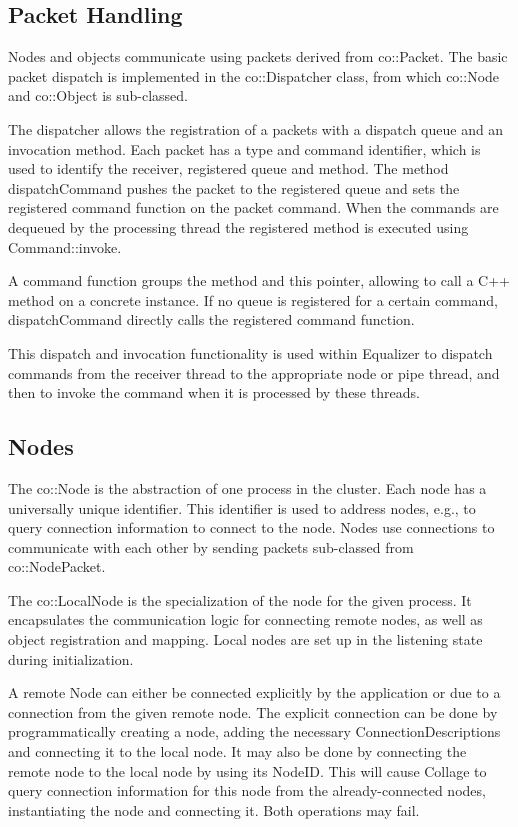 \documentclass[10pt,a4]{scrartcl}
\begin{document}
\subsection{Packet Handling}

Nodes and objects communicate using packets derived from
\textsf{co::Packet}. The basic packet dispatch is implemented in the
\textsf{co::Dispatcher} class, from which \textsf{co::Node} and \textsf{co::Object} is sub-classed.

The dispatcher allows the registration of a packets with a dispatch queue and an
invocation method. Each packet has a type and command identifier, which is used
to identify the receiver, registered queue and method. The method
\textsf{dispatchCommand} pushes the packet to the registered queue and sets the
registered command function on the packet command. When the
commands are dequeued by the processing thread the registered method is executed
using \textsf{Command::invoke}.

A command function groups the method and \textsf{this} pointer, allowing
to call a C++ method on a concrete instance. If no queue is registered
for a certain command, \textsf{dispatchCommand} directly calls the
registered command function.

This dispatch and invocation functionality is used within Equalizer to
dispatch commands from the receiver thread to the appropriate node or
pipe thread, and then to invoke the command when it is processed by
these threads.

\subsection{Nodes}

The \textsf{co::Node} is the abstraction of one process in the cluster. Each
node has a universally unique identifier. This identifier is used to address
nodes, e.g., to query connection information to connect to the node. Nodes use
connections to communicate with each other by sending packets sub-classed from
\textsf{co::NodePacket}.

The \textsf{co::LocalNode} is the specialization of the node for the given
process. It encapsulates the communication logic for connecting remote nodes, as
well as object registration and mapping. Local nodes are set up in the listening
state during initialization.

A remote \textsf{Node} can either be connected explicitly by the application or
due to a connection from the given remote node. The explicit connection can be
done by programmatically creating a node, adding the necessary
\textsf{ConnectionDescription}s and connecting it to the local node. It may also
be done by connecting the remote node to the local node by using its
\textsf{NodeID}. This will cause Collage to query connection information for
this node from the already-connected nodes, instantiating the node and
connecting it. Both operations may fail.
\end{document}
